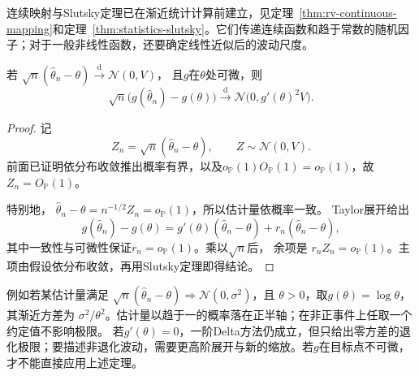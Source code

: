 连续映射与Slutsky定理已在渐近统计计算前建立，见定理~\ref{thm:rv-continuous-mapping}和定理~\ref{thm:statistics-slutsky}。它们传递连续函数和趋于常数的随机因子；对于一般非线性函数，还要确定线性近似后的波动尺度。

\begin{theorem}[Delta方法]
\label{thm:statistics-delta-method}
若
\(\sqrt n(\widehat\theta_n-\theta)\xrightarrow{\mathrm d}\mathcal N(0,V)\)，
且\(g\)在\(\theta\)处可微，则
\[
  \sqrt n\bigl(g(\widehat\theta_n)-g(\theta)\bigr)
  \xrightarrow{\mathrm d}
  \mathcal N\bigl(0,g'(\theta)^2V\bigr).
\]
\end{theorem}

\begin{proof}
记
\[
  Z_n=\sqrt n(\widehat\theta_n-\theta),
  \qquad
  Z\sim\mathcal N(0,V).
\]
前面已证明依分布收敛推出概率有界，以及\(o_{\mathbb P}(1)O_{\mathbb P}(1)=o_{\mathbb P}(1)\)，故\(Z_n=O_{\mathbb P}(1)\)。

特别地，
\(\widehat\theta_n-\theta=n^{-1/2}Z_n=o_{\mathbb{P}}(1)\)，所以估计量依概率一致。
Taylor展开给出
\[
  g(\widehat\theta_n)-g(\theta)
  =g'(\theta)(\widehat\theta_n-\theta)
   +r_n(\widehat\theta_n-\theta),
\]
其中一致性与可微性保证\(r_n=o_{\mathbb{P}}(1)\)。乘以\(\sqrt n\)后，
余项是
\(r_nZ_n=o_{\mathbb{P}}(1)\)。主项由假设依分布收敛，再用Slutsky定理即得结论。
\end{proof}

例如若某估计量满足
\(\sqrt n(\widehat\theta_n-\theta)\Rightarrow\mathcal N(0,\sigma^2)\)，且
\(\theta>0\)，取\(g(\theta)=\log\theta\)，其渐近方差为
\(\sigma^2/\theta^2\)。估计量以趋于一的概率落在正半轴；在非正事件上任取一个约定值不影响极限。
若\(g'(\theta)=0\)，一阶Delta方法仍成立，但只给出零方差的退化极限；要描述非退化波动，需要更高阶展开与新的缩放。若\(g\)在目标点不可微，才不能直接应用上述定理。

